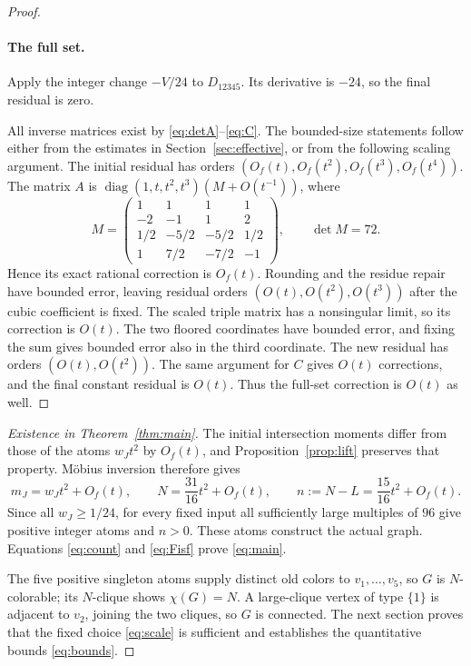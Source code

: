 \documentclass[11pt,a4paper]{article}
\theoremstyle{definition}
\DeclareMathOperator{\diag}{diag}
\begin{document}
\begin{proof}
\paragraph{The full set.}
Apply the integer change $-V/24$ to $D_{12345}$.
Its derivative is $-24$, so the final residual is zero.

All inverse matrices exist by \eqref{eq:detA}--\eqref{eq:C}.
The bounded-size statements follow either from the estimates in
Section~\ref{sec:effective}, or from the following scaling argument.
The initial residual has orders
$(O_f(t),O_f(t^2),O_f(t^3),O_f(t^4))$.
The matrix $A$ is
$\diag(1,t,t^2,t^3)(M+O(t^{-1}))$, where
\[
 M=\begin{pmatrix}
 1&1&1&1\\-2&-1&1&2\\
 1/2&-5/2&-5/2&1/2\\
 1&7/2&-7/2&-1
 \end{pmatrix},\qquad \det M=72.
\]
Hence its exact rational correction is $O_f(t)$.
Rounding and the residue repair have bounded error, leaving residual
orders $(O(t),O(t^2),O(t^3))$ after the cubic coefficient is fixed.
The scaled triple matrix has a nonsingular limit, so its correction
is $O(t)$. The two floored coordinates have bounded error, and fixing
the sum gives bounded error also in the third coordinate. The new residual
has orders $(O(t),O(t^2))$.
The same argument for $C$ gives $O(t)$ corrections, and the final constant
residual is $O(t)$. Thus the full-set correction is $O(t)$ as well.
\end{proof}

\begin{proof}[Existence in Theorem~\ref{thm:main}]
The initial intersection moments differ from those of the atoms
$w_Jt^2$ by $O_f(t)$, and Proposition~\ref{prop:lift} preserves that
property. Möbius inversion therefore gives
\[
 m_J=w_Jt^2+O_f(t),\qquad
 N=\frac{31}{16}t^2+O_f(t),\qquad
 n:=N-L=\frac{15}{16}t^2+O_f(t).
\]
Since all $w_J\ge1/24$, for every fixed input all sufficiently large
multiples of $96$ give positive integer atoms and $n>0$.
These atoms construct the actual graph. Equations \eqref{eq:count}
and \eqref{eq:Fisf} prove \eqref{eq:main}.

The five positive singleton atoms supply distinct old colors to
$v_1,\ldots,v_5$, so $G$ is $N$-colorable; its $N$-clique shows
$\chi(G)=N$. A large-clique vertex of type $\{1\}$ is adjacent to $v_2$,
joining the two cliques, so $G$ is connected.
The next section proves that the fixed choice \eqref{eq:scale} is sufficient
and establishes the quantitative bounds \eqref{eq:bounds}.
\end{proof}
\end{document}
